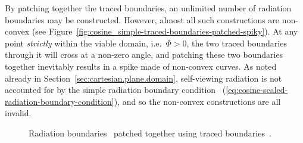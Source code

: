\begin{figure}
\end{figure}

By patching together the traced boundaries,
an unlimited number of radiation boundaries may be constructed.
However, almost all such constructions are non-convex
(see Figure~\ref{fig:cosine_simple-traced-boundaries-patched-spiky}).
At any point \emph{strictly} within the viable domain,
i.e.~$\Phi > 0$,
the two traced boundaries through it will cross at a non-zero angle,
and patching these two boundaries together
inevitably results in a spike made of non-convex curves.
As noted already in Section~\ref{sec:cartesian.plane.domain},
self-viewing radiation is not accounted for
by the simple radiation boundary condition~%
  (\ref{eq:cosine-scaled-radiation-boundary-condition}),
and so the non-convex constructions are all invalid.

\begin{figure}
  \newcommand*{\subfigurewidth}{0.36\textwidth}
  \centering
  \hspace*{\fill}
  \begin{subfigure}[t]{\subfigurewidth}
  \end{subfigure}
    \hfill
  \begin{subfigure}[t]{\subfigurewidth}
  \end{subfigure}
  \hspace*{\fill}
  \caption{
    Radiation boundaries~ patched together
    using traced boundaries~.
  }
  \label{fig:cosine_simple-traced-boundaries-patched}
\end{figure}

\begin{figure}
\end{figure}

